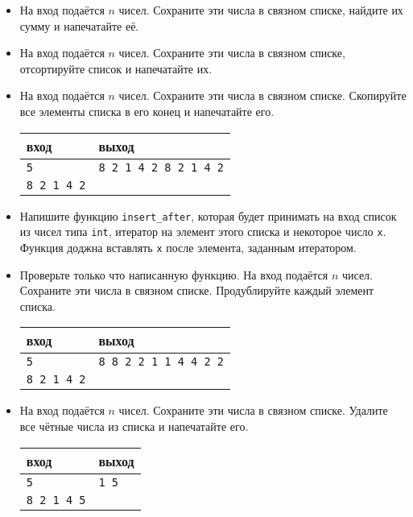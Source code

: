 \documentclass{article}
\begin{document}
\begin{itemize}
\item На вход подаётся $n$ чисел. Сохраните эти числа в связном списке, найдите их сумму и напечатайте её.
\item На вход подаётся $n$ чисел. Сохраните эти числа в связном списке, отсортируйте список и напечатайте их.

\item На вход подаётся $n$ чисел. Сохраните эти числа в связном списке. Скопируйте все элементы списка в его конец и напечатайте его.
\begin{center}
\begin{tabular}{ l | l }
 вход & выход \\ \hline
 \texttt{5} & \texttt{8 2 1 4 2 8 2 1 4 2}  \\ 
 \texttt{8 2 1 4 2} &  \\
\end{tabular}
\end{center}

\item Напишите функцию \texttt{insert\_after}, которая будет принимать на вход список из чисел типа \texttt{int}, итератор на элемент этого списка и некоторое число \texttt{x}. Функция доджна вставлять \texttt{x} после элемента, заданным итератором.

\item Проверьте только что написанную функцию. На вход подаётся $n$ чисел. Сохраните эти числа в связном списке. Продублируйте каждый элемент списка.
\begin{center}
\begin{tabular}{ l | l }
 вход & выход \\ \hline
 \texttt{5} & \texttt{8 8 2 2 1 1 4 4 2 2}  \\ 
 \texttt{8 2 1 4 2} &  \\
\end{tabular}
\end{center}

\item На вход подаётся $n$ чисел. Сохраните эти числа в связном списке. Удалите все чётные числа из списка и напечатайте его.
\begin{center}
\begin{tabular}{ l | l }
 вход & выход \\ \hline
 \texttt{5} & \texttt{1 5}  \\ 
 \texttt{8 2 1 4 5} &  \\
\end{tabular}
\end{center}

\end{itemize}
\end{document}
